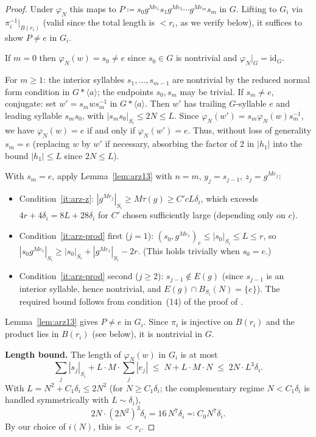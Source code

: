 \documentclass[12pt]{amsart}
\theoremstyle{plain}
\theoremstyle{definition}
\begin{document}
\begin{proof}
Under $\varphi_N$ this maps to $P \coloneqq s_0 g^{Me_1} s_1 g^{Me_2} \cdots g^{Me_m} s_m$ in $G$.
Lifting to $G_i$ via $\pi_i^{-1}|_{B(r_i)}$ (valid since the total length is $< r_i$,
as we verify below), it suffices to show $P \neq e$ in $G_i$.

If $m = 0$ then $\varphi_N(w) = s_0 \neq e$ since $s_0 \in G$ is nontrivial and
$\varphi_N|_G = \mathrm{id}_G$.

For $m \geq 1$: the interior syllables $s_1, \ldots, s_{m-1}$ are nontrivial by
the reduced normal form condition in $G * \langle a \rangle$; the endpoints $s_0, s_m$
may be trivial.
If $s_m \neq e$, conjugate: set $w' = s_m w s_m^{-1}$ in $G * \langle a \rangle$.
Then $w'$ has trailing $G$-syllable $e$ and leading syllable $s_m s_0$, with
$|s_m s_0|_{S_i} \leq 2N \leq L$.
Since $\varphi_N(w') = s_m \varphi_N(w) s_m^{-1}$, we have $\varphi_N(w) = e$
if and only if $\varphi_N(w') = e$.
Thus, without loss of generality $s_m = e$ (replacing $w$ by $w'$ if necessary, absorbing the factor of 2
in $|h_1|$ into the bound $|h_1| \leq L$ since $2N \leq L$).

With $s_m = e$, apply Lemma~\ref{lem:arz13} with $n = m$, $y_j = s_{j-1}$,
$z_j = g^{Me_j}$:
\begin{itemize}
  \item Condition~\ref{it:arz-z}: $|g^{Me_j}|_{S_i} \geq M\tau(g) \geq C'cL\delta_i$,
    which exceeds $4r + 4\delta_i = 8L + 28\delta_i$ for $C'$ chosen sufficiently
    large (depending only on $c$).
  \item Condition~\ref{it:arz-prod} first ($j=1$): $(s_0, g^{Me_1})_e \leq |s_0|_{S_i} \leq L \leq r$,
    so $|s_0 g^{Me_1}|_{S_i} \geq |s_0|_{S_i} + |g^{Me_1}|_{S_i} - 2r$.
    (This holds trivially when $s_0 = e$.)
  \item Condition~\ref{it:arz-prod} second ($j \geq 2$): $s_{j-1} \notin E(g)$
    (since $s_{j-1}$ is an interior syllable, hence nontrivial, and
    $E(g) \cap B_{S_i}(N) = \{e\}$). The required bound follows from
    condition~(14) of the proof of \cite[Theorem~1]{Arz01}.
\end{itemize}
Lemma~\ref{lem:arz13} gives $P \neq e$ in $G_i$.
Since $\pi_i$ is injective on $B(r_i)$ and the product lies in $B(r_i)$ (see below),
it is nontrivial in $G$.

\medskip\noindent\textbf{Length bound.} The length of $\varphi_N(w)$ in $G_i$ is at most
\[
  \textstyle\sum_j|s_j|_{S_i} + L\cdot M\cdot\sum_j|e_j|
  \;\leq\; N + L\cdot M\cdot N
  \;\leq\; 2N\cdot L^3\delta_i.
\]
With $L = N^2 + C_1\delta_i \leq 2N^2$ (for $N \geq C_1\delta_i$; the
complementary regime $N < C_1\delta_i$ is handled symmetrically with $L \sim \delta_i$),
\[
  2N\cdot(2N^2)^3\delta_i = 16\,N^7\delta_i \eqqcolon C_0 N^7\delta_i.
\]
By our choice of $i(N)$, this is $< r_i$. 


\end{proof}
\end{document}
